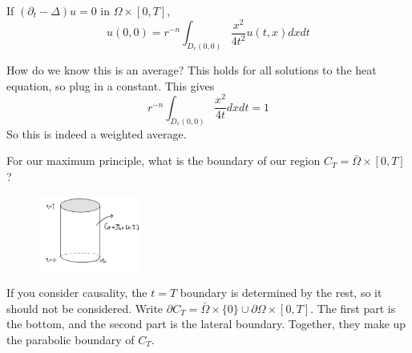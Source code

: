 \begin{theorem}
    If $\left(\partial_{t}-\Delta\right) u=0$ in $\Omega \times[0, T]$,
$$
u(0,0)=r^{-n} \int_{D_{r}(0,0)} \frac{x^{2}}{4 t^{2}} u(t, x) d x d t
$$
\end{theorem}
\begin{remark}
    How do we know this is an average? This holds for all solutions to the heat equation, so plug in a constant. This gives
$$
r^{-n} \int_{D_{r}(0,0)} \frac{x^{2}}{4 t} d x d t=1
$$
So this is indeed a weighted average.
\end{remark}

For our maximum principle, what is the boundary of our region $C_T = \bar \Omega \times [0,T]$?

\begin{figure}[H]
    \centering
    \includegraphics[width=0.3\textwidth]{Pics/24-2.png}
\end{figure}

If you consider causality, the $t=T$ boundary is determined by the rest, so it should not be considered. Write $\partial C_{T}=\bar{\Omega} \times\{0\} \cup \partial \Omega \times[0, T] .$ The first part is the bottom, and the second part is the lateral boundary. Together, they make up the parabolic boundary of $C_{T}$.

